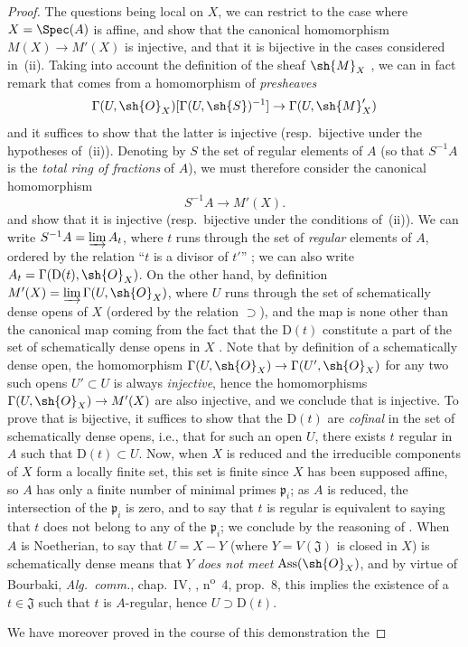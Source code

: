 \begin{proof}
The questions being local on $X$, we can restrict to the case where $X=\Spec(A)$ is affine, and show that the canonical homomorphism $M(X)\to M'(X)$ is injective, and that it is bijective in the cases considered in~(ii).
Taking into account the definition of the sheaf $\sh{M}_X$ , we can in fact remark that  comes from a homomorphism of \emph{presheaves}
\[
  \Gamma(U,\sh{O}_X)[\Gamma(U,\sh{S})^{-1}]\to\Gamma(U,\sh{M}'_X)
\]
and it suffices to show that the latter is injective (resp.\ bijective under the hypotheses of~(ii)).
Denoting by $S$ the set of regular elements of $A$ (so that $S^{-1}A$ is the \emph{total ring of fractions} of $A$), we must therefore consider the canonical homomorphism
\[
\label{IV.20.2.11.1}
  S^{-1}A\to M'(X).
  \tag{20.2.11.1}
\]
and show that it is injective (resp.\ bijective under the conditions of~(ii)).
We can write $S^{-1}A=\varinjlim A_t$, where $t$ runs through the set of \emph{regular} elements of $A$, ordered by the relation ``$t$ is a divisor of $t'$'' ;
we can also write $A_t=\Gamma(\mathrm{D}(t),\sh{O}_X)$.
On the other hand, by definition $M'(X)=\varinjlim\Gamma(U,\sh{O}_X)$, where $U$ runs through the set of schematically dense opens of $X$ (ordered by the relation $\supset$), and the map  is none other than the canonical map coming from the fact that the $\mathrm{D}(t)$ constitute a part of the set of schematically dense opens in $X$ .
Note that by definition of a schematically dense open, the homomorphism $\Gamma(U,\sh{O}_X)\to\Gamma(U',\sh{O}_X)$ for any two such opens $U'\subset U$ is always \emph{injective}, hence the homomorphisms $\Gamma(U,\sh{O}_X)\to M'(X)$ are also injective, and we conclude that  is injective.
To prove that  is bijective, it suffices to show that the $\mathrm{D}(t)$ are \emph{cofinal} in the set of schematically dense opens, i.e., that for such an open $U$, there exists $t$ regular in $A$ such that $\mathrm{D}(t)\subset U$.
Now, when $X$ is reduced and the irreducible components of $X$ form a locally finite set, this set is finite since $X$ has been supposed affine, so $A$ has only a finite number of minimal primes $\mathfrak{p}_i$;
as $A$ is reduced, the intersection of the $\mathfrak{p}_i$ is zero, and to say that $t$ is regular is equivalent to saying that $t$ does not belong to any of the $\mathfrak{p}_i$;
we conclude by the reasoning of .
When $A$ is Noetherian, to say that $U=X-Y$ (where $Y=V(\mathfrak{J})$ is closed in $X$) is schematically dense means  that $Y$ \emph{does not meet} $\operatorname{Ass}(\sh{O}_X)$, and by virtue of Bourbaki, \emph{Alg.~comm.}, chap.~IV, , n\textsuperscript{o}~4, prop.~8, this implies the existence of a $t\in\mathfrak{J}$ such that $t$ is $A$-regular, hence $U\supset\mathrm{D}(t)$.

We have moreover proved in the course of this demonstration the
\end{proof}


